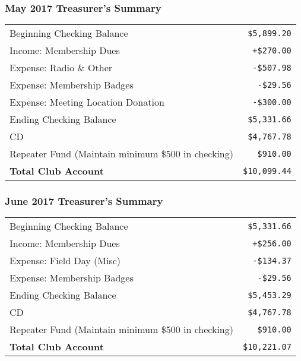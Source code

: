 \documentclass[10pt,letterpaper]{article}
\begin{document}
\subsubsection{May 2017 Treasurer's Summary}
\noindent
\begin{tabular}{|l|r|}
  \hline
  Beginning Checking Balance & \texttt{\$5,899.20} \\
  Income: Membership Dues & \texttt{+\$270.00} \\
  Expense: Radio \& Other & \texttt{-\$507.98} \\
  Expense: Membership Badges & \texttt{-\$29.56} \\
  Expense: Meeting Location Donation & \texttt{-\$300.00} \\
  Ending Checking Balance & \texttt{\$5,331.66} \\
  \hline
  \hline
  CD & \texttt{\$4,767.78} \\
  \hline
  \hline
  Repeater Fund (Maintain minimum \$500 in checking) & \texttt{\$910.00} \\
  \hline
  \hline
  \textbf{Total Club Account} & \texttt{\$10,099.44} \\
  \hline
\end{tabular}

\subsubsection{June 2017 Treasurer's Summary}
\noindent
\begin{tabular}{|l|r|}
  \hline
  Beginning Checking Balance & \texttt{\$5,331.66} \\
  Income: Membership Dues & \texttt{+\$256.00} \\
  Expense: Field Day (Misc) & \texttt{-\$134.37} \\
  Expense: Membership Badges & \texttt{-\$29.56} \\
  Ending Checking Balance & \texttt{\$5,453.29} \\
  \hline
  \hline
  CD & \texttt{\$4,767.78} \\
  \hline
  \hline
  Repeater Fund (Maintain minimum \$500 in checking) & \texttt{\$910.00} \\
  \hline
  \hline
  \textbf{Total Club Account} & \texttt{\$10,221.07} \\
  \hline
\end{tabular}
\end{document}

